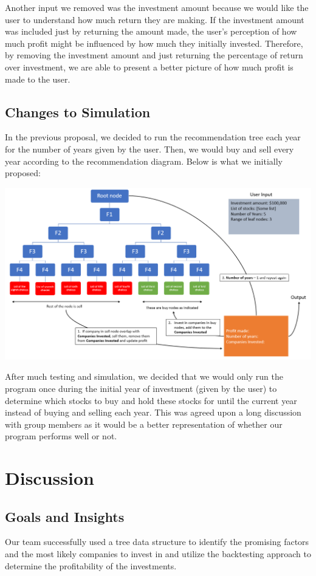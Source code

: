 \documentclass[fontsize=11pt]{article}
\begin{document}
Another input we removed was the investment amount because we would like the user to understand how much return they are making. If the investment amount was included just by returning the amount made, the user's perception of how much profit might be influenced by how much they initially invested. Therefore, by removing the investment amount and just returning the percentage of return over investment, we are able to present a better picture of how much profit is made to the user.
\subsection{Changes to Simulation}
In the previous proposal, we decided to run the recommendation tree each year for the number of years given by the user. Then, we would buy and sell every year according to the recommendation diagram. Below is what we initially proposed:
\begin{center}
\includegraphics[scale=0.65]{ai_diagram.png}
\end{center}
After much testing and simulation, we decided that we would only run the program once during the initial year of investment (given by the user) to determine which stocks to buy and hold these stocks for until the current year instead of buying and selling each year. This was agreed upon a long discussion with group members as it would be a better representation of whether our program performs well or not.
\section{Discussion}

\subsection{Goals and Insights}
Our team successfully used a tree data structure to identify the promising factors and the most likely companies to invest in and utilize the backtesting approach to determine the profitability of the investments.\\
\end{document}
